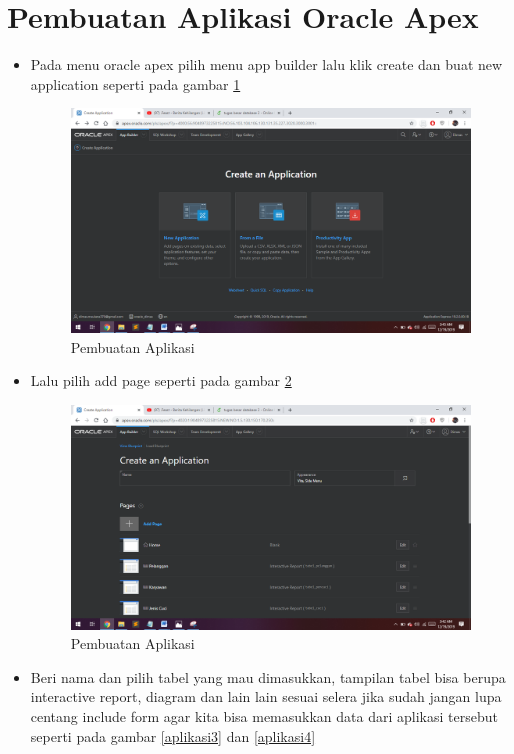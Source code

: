 \documentclass{article}
\begin{document}
\section{Pembuatan Aplikasi Oracle Apex}
\begin{itemize}
\item Pada menu oracle apex pilih menu app builder lalu klik create dan buat new application seperti pada gambar \ref{aplikasi1}
\begin{figure}[!htbp]
    \centering
    \includegraphics[scale=0.28]{figures/13.PNG}
    \caption{Pembuatan Aplikasi}
    \label{aplikasi1}
\end{figure}
\item Lalu pilih add page seperti pada gambar \ref{aplikasi2}
\begin{figure}[!htbp]
    \centering
    \includegraphics[scale=0.28]{figures/12.PNG}
    \caption{Pembuatan Aplikasi}
    \label{aplikasi2}
\end{figure}
\item Beri nama dan pilih tabel yang mau dimasukkan, tampilan tabel bisa berupa interactive report, diagram dan lain lain sesuai selera jika sudah jangan lupa centang include form agar kita bisa memasukkan data dari aplikasi tersebut seperti pada gambar \ref{aplikasi3} dan \ref{aplikasi4}

\end{itemize}
\end{document}
